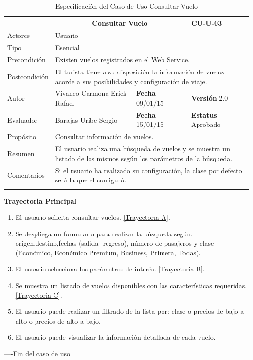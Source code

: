 \begin{longtable}{|p{2.5cm}|p{6.4cm}|p{2cm}|p{2cm}|}
	\hline
		\rowcolor[RGB]{51,153,255}{Caso de Uso}&\multicolumn{2}{c}{Consultar Vuelo}&{\textbf{CU-U-03}}\\
	\hline
		{Actores}&\multicolumn{3}{p{11.2cm}|}{Usuario}\\
	\hline
		{Tipo}&\multicolumn{3}{p{11.2cm}|}{Esencial}\\
	\hline
		{Precondición}&\multicolumn{3}{p{11.2cm}|}{Existen vuelos registrados en el Web Service.}\\
	\hline
		{Postcondición}&\multicolumn{3}{p{11.2cm}|}{El turista tiene a su disposición la información de vuelos acorde a sus posibilidades y configuración de viaje.}\\
	\hline
		{Autor}&{Vivanco Carmona Erick Rafael}&{\textbf{Fecha} 09/01/15}&{\textbf{Versión} 2.0}\\
			\hline
		{Evaluador}&{Barajas Uribe Sergio}&{\textbf{Fecha} 15/01/15}&{\textbf{Estatus} Aprobado}\\
	\hline
		{Propósito}&\multicolumn{3}{p{11.2cm}|}{Consultar información de vuelos.}\\
	\hline
		{Resumen}&\multicolumn{3}{p{11.2cm}|}{El usuario realiza una búsqueda de vuelos y se muestra un listado de los mismos según los parámetros de la búsqueda.}\\	
	\hline
		{Comentarios}&\multicolumn{3}{p{11.2cm}|}{Si el usuario ha realizado su configuración, la clase por defecto será la que el configuró.}\\	
	\hline
	\caption[Especificación del Caso de Uso Consultar Vuelo]{Especificación del Caso de Uso Consultar Vuelo}
    	\label{tab:cuConsultarVuelo}
\end{longtable}
\newpage
\begin{flushleft}
	\textbf{Trayectoria Principal}\\
	\begin{enumerate}
		\item El usuario solicita consultar vuelos. \hyperlink{TrayectoriaA_CU-U-03}{[Trayectoria A]}.
		\item Se despliega un formulario para realizar la búsqueda según: origen,destino,fechas (salida- regreso), número de pasajeros y clase (Económico, Económico Premium, Business, Primera, Todas).
		\item El usuario selecciona los parámetros de interés. \hyperlink{TrayectoriaB_CU-U-03}{[Trayectoria B]}.
		\item Se  muestra un listado de vuelos disponibles con las características requeridas. \hyperlink{TrayectoriaC_CU-U-03}{[Trayectoria C]}.
		\item El usuario puede realizar un filtrado de la lista por: clase o precios de bajo a alto o precios de alto a bajo.
		\item	El usuario puede visualizar la información detallada de cada vuelo.
	\end{enumerate}
\end{flushleft}
----Fin del caso de uso

